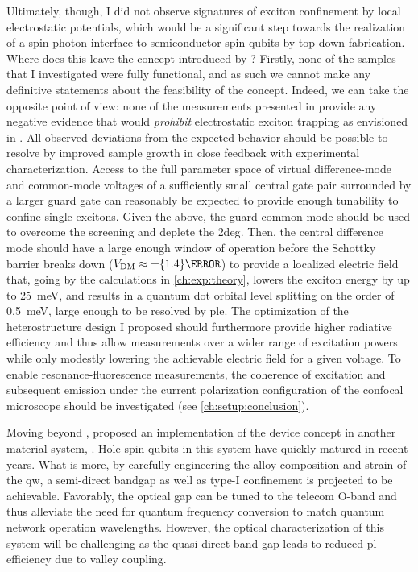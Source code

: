 Ultimately, though, I did not observe signatures of exciton confinement by local electrostatic potentials, which would be a significant step towards the realization of a spin-photon interface to semiconductor spin qubits by top-down fabrication.
Where does this leave the concept introduced by \citet{Descamps2021}?
Firstly, none of the samples that I investigated were fully functional, and as such we cannot make any definitive statements about the feasibility of the concept.
Indeed, we can take the opposite point of view: none of the measurements presented in \thethesis provide any negative evidence that would \emph{prohibit} electrostatic exciton trapping as envisioned in .
All observed deviations from the expected behavior should be possible to resolve by improved sample growth in close feedback with experimental characterization.
Access to the full parameter space of virtual difference-mode and common-mode voltages of a sufficiently small central gate pair surrounded by a larger guard gate can reasonably be expected to provide enough tunability to confine single excitons.
Given the above, the guard common mode should be used to overcome the screening and deplete the \gls{2deg}.
Then, the central difference mode should have a large enough window of operation before the Schottky barrier breaks down ($\VDM\approx\pm\qty{1.4}{\volt}$) to provide a localized electric field that, going by the calculations in \cref{ch:exp:theory}, lowers the exciton energy by up to \qty{25}{\milli\electronvolt}, and results in a quantum dot orbital level splitting on the order of \qty{0.5}{\milli\electronvolt}, large enough to be resolved by \gls{ple}.
The optimization of the heterostructure design I proposed should furthermore provide higher radiative efficiency and thus allow measurements over a wider range of excitation powers while only modestly lowering the achievable electric field for a given voltage.
To enable resonance-fluorescence measurements, the coherence of excitation and subsequent emission under the current polarization configuration of the confocal microscope should be investigated (see \cref{ch:setup:conclusion}).

Moving beyond , \citet{Reznikov2024} proposed an implementation of the device concept in another material system, .
Hole spin qubits in this system have quickly matured in recent years.
What is more, by carefully engineering the alloy composition and strain of the \gls{qw}, a semi-direct
bandgap as well as type-I confinement
is projected to be achievable.
Favorably, the optical gap can be tuned to the telecom O-band and thus alleviate the need for quantum frequency conversion to match quantum network operation wavelengths.
However, the optical characterization of this system will be challenging as the quasi-direct band gap leads to reduced \gls{pl} efficiency due to valley coupling.